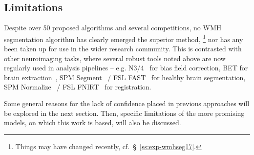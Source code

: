 \subsection{Limitations}\label{ss:priorlimits}
Despite over 50 proposed algorithms and several competitions,
no WMH segmentation algorithm has clearly emerged the superior method,%
\footnote{Things may have changed recently, cf.~\S~\ref{ss:exp-wmhseg17}.}
nor has any been taken up for use in the wider research community.
This is contrasted with other neuroimaging tasks,
where several robust tools noted above are now regularly used in analysis pipelines -- e.g.
N3/4~\cite{Tustison2010} for bias field correction,
BET for brain extraction~\cite{Smith2002a},
SPM Segment~\cite{Ashburner2005} / FSL FAST~\cite{Zhang2001} for healthy brain segmentation,
SPM Normalize~\cite{Ashburner2005} / FSL FNIRT~\cite{Andersson2007} for registration.
\par
Some general reasons for
the lack of confidence placed in previous approaches will be explored in the next section.
Then, specific limitations of the more promising models, on which this work is based,
will also be discussed.
